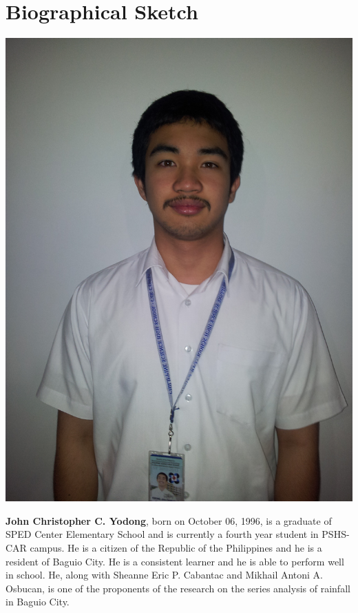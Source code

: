 \chapter{Biographical Sketch}
\noindent
{\singlespacing
\begin{minipage}{0.3\textwidth}
\includegraphics[width=0.8\linewidth]{Figures/2013-03-04-17-00-28}
\end{minipage}\hfill
\begin{minipage}{0.68\textwidth}
\textbf{John Christopher C. Yodong}, born on October 06, 1996, is a graduate of SPED Center Elementary School and is currently a fourth year student in PSHS-CAR campus. He is a citizen of the Republic of the Philippines and he is a resident of Baguio City. He is a consistent learner and he is able to perform well in school.  He, along with Sheanne Eric P. Cabantac and Mikhail Antoni A. Osbucan, is one of the proponents of the research on the series analysis of rainfall in Baguio City. 
\end{minipage}

\vfill

}
